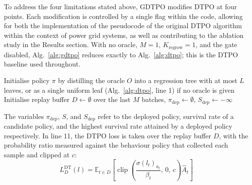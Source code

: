 To address the four limitations stated above, GDTPO modifies DTPO at four points. Each modification is controlled by a single flag within the code, allowing for both the implementation of the pseudocode of the original DTPO algorithm within the context of power grid systems, as well as contributing to the ablation study in the Results section. With no oracle, $M = 1$, $K_{\text{regrow}} = 1$, and the gate disabled, Alg.~\ref{alg:gdtpo} reduces exactly to Alg.~\ref{alg:dtpo}; this is the DTPO baseline used throughout.



\begin{algorithm}[H]
\label{alg:gdtpo}
\SetAlgoVlined
\DontPrintSemicolon
Initialise policy $\pi$ by distilling the oracle $O$ into a regression tree with at most $L$ leaves, or as a single uniform leaf (Alg.~\ref{alg:dtpo}, line 1) if no oracle is given\;
Initialise replay buffer $D \leftarrow \emptyset$ over the last $M$ batches, $\pi_{\text{dep}} \leftarrow \emptyset$, $S_{\text{dep}} \leftarrow -\infty$\;
\caption{Gated Decision Tree Policy Optimisation (GDTPO)}
\end{algorithm}

The variables $\pi_{\text{dep}}$, $S$, and $S_{\text{dep}}$ refer to the deployed policy, survival rate of a candidate policy, and the highest survival rate attained by a deployed policy respectively. In line 11, the DTPO loss is taken over the replay buffer $D$, with the probability ratio measured against the behaviour policy that collected each sample and clipped at $c$:
\begin{equation}
L^{\text{DT}}_D(l) = \mathbb{E}_{t \in D}\!\left[ \operatorname{clip}\!\left(\frac{\sigma(l_t)_{a_t}}{\beta_t},\, 0,\, c\right) \hat{A}_t \right]
\label{eq:ldt_replay}
\end{equation}

